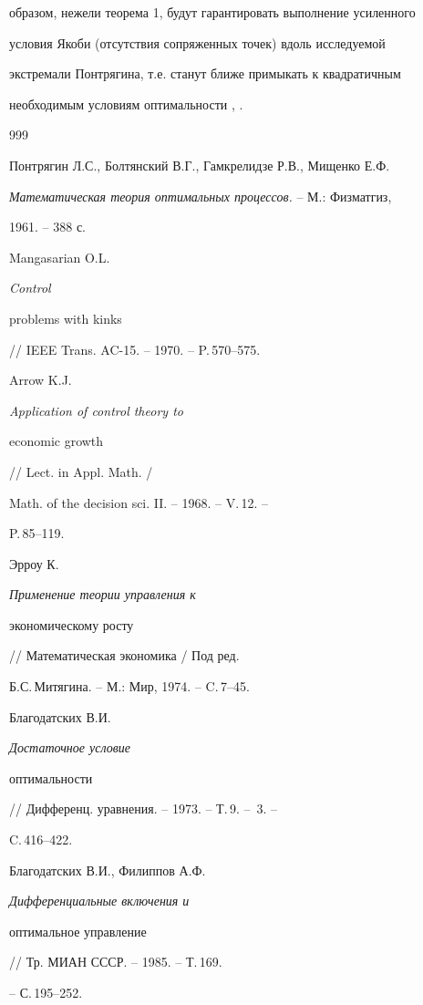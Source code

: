 образом, нежели теорема 1, будут гарантировать выполнение усиленного


условия Якоби (отсутствия сопряженных точек) вдоль исследуемой


экстремали Понтрягина, т.е. станут ближе примыкать к квадратичным


необходимым условиям оптимальности \cite{13}, \cite{16}.








\begin{thebibliography}{999}







Понтрягин Л.С., Болтянский В.Г., Гамкрелидзе Р.В., Мищенко Е.Ф.


{\it Математическая теория оптимальных процессов.} -- М.: Физматгиз,


1961. -- 388 с.




Mangasarian O.L. {\it Control


problems with kinks} // IEEE Trans. AC-15. -- 1970. -- P.\,570--575.




Arrow K.J. {\it Application of control theory to


economic growth} // Lect. in Appl. Math. /


Math. of the decision sci. II. -- 1968. -- V.\,12. --


P.\,85--119.




Эрроу К. {\it Применение теории управления к


экономическому росту} // Математическая экономика / Под ред.


Б.С.\,Митягина. -- М.: Мир, 1974. -- C.\,7--45.


 Благодатских В.И. {\it Достаточное условие


оптимальности} // Дифференц. уравнения. -- 1973. -- Т.\,9. -- \No\,3. --


C.\,416--422.




Благодатских В.И., Филиппов А.Ф. {\it Дифференциальные включения и


оптимальное управление} // Тр. МИАН СССР. -- 1985. -- Т.\,169.


-- С.\,195--252.



\end{thebibliography}
